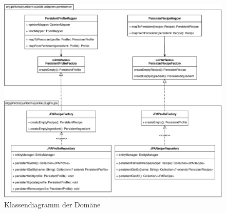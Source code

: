\begin{figure}[ht!]
    \includegraphics[width=0.98\columnwidth]{../diagrams/factory_uml.pdf}
    \caption{Klassendiagramm der Domäne}
    \label{fig:class-diag-factory}
\end{figure}
